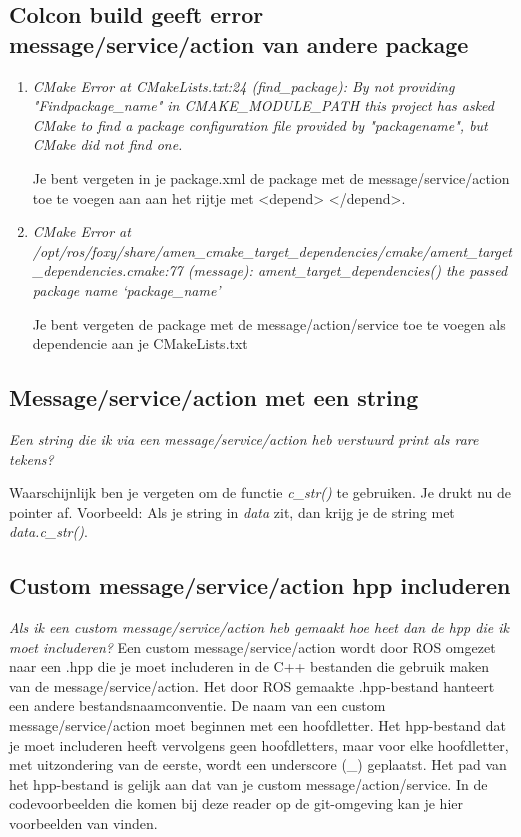 \subsection{Colcon build geeft error  message/service/action van andere package}
\begin{enumerate}
\item \textit{CMake Error at CMakeLists.txt:24 (find\_package):
  By not providing "Findpackage\_name" in CMAKE\_MODULE\_PATH this
  project has asked CMake to find a package configuration file provided by
  "packagename", but CMake did not find one.}

Je bent vergeten in je package.xml de package met de message/service/action toe te voegen aan aan het rijtje met <depend> </depend>.

\item \textit{CMake Error at /opt/ros/foxy/share/amen\_cmake\_target\_dependencies/cmake/ament\_target\_dependencies.cmake:77 (message):
  ament\_target\_dependencies() the passed package name `package\_name'}

Je bent vergeten de package met de message/action/service toe te voegen als dependencie aan je CMakeLists.txt

\end{enumerate}
\subsection{Message/service/action met een string}
\textit{Een string die ik via een message/service/action heb verstuurd print als rare tekens?}

Waarschijnlijk ben je vergeten om de functie \textit{c\_str()} te gebruiken. Je drukt nu de pointer af. Voorbeeld: Als je string in \textit{data} zit, dan krijg je de string met \textit{data.c\_str()}.

\subsection{Custom message/service/action hpp includeren}
\textit{Als ik een custom message/service/action heb gemaakt hoe heet dan de hpp die ik moet includeren?}
Een custom message/service/action wordt door ROS omgezet naar een .hpp die je moet includeren in de C++ bestanden die gebruik maken van de message/service/action. Het door ROS gemaakte .hpp-bestand hanteert een andere bestandsnaamconventie.
De naam van een custom message/service/action moet beginnen met een hoofdletter. Het hpp-bestand dat je moet includeren heeft vervolgens geen hoofdletters, maar voor elke hoofdletter, met uitzondering van de eerste, wordt een underscore (\_) geplaatst. Het pad van het hpp-bestand is gelijk aan dat van je custom message/action/service. In de codevoorbeelden die komen bij deze reader op de git-omgeving kan je hier voorbeelden van vinden.

